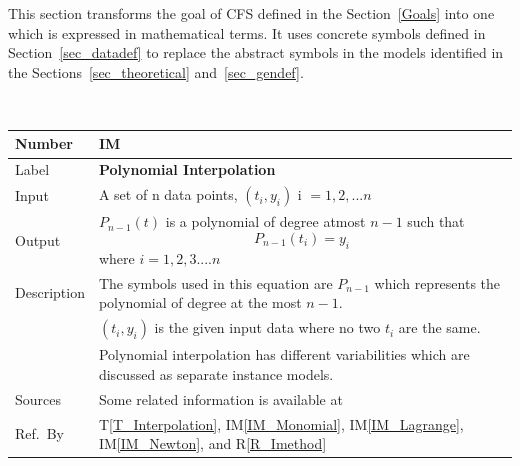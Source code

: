 \documentclass[12pt]{article}
\newcommand{\colAwidth}{0.13\textwidth}
\newcommand{\colBwidth}{0.82\textwidth}
\newcommand{\tref}[1]{T\ref{#1}}
\newcounter{instnum} %
\newcommand{\iref}[1]{IM\ref{#1}}
\newcommand{\rref}[1]{R\ref{#1}}
\newcommand{\famname}{CFS} %
\begin{document}
This section transforms the goal of \famname{} defined in the Section~\ref{Goals} into one which is expressed in mathematical terms. It uses concrete symbols defined in Section~\ref{sec_datadef} to replace the abstract symbols in the models identified in the Sections~\ref{sec_theoretical} and~\ref{sec_gendef}.

~\newline
\noindent
\begin{minipage}{\textwidth}
	\renewcommand*{\arraystretch}{1.5}
	\begin{tabular}{| p{\colAwidth} | p{\colBwidth}|}
		\hline
		\rowcolor[gray]{0.9}
		Number
		& IM{instnum}\theinstnum \label{IM_Polynomial}\\
		\hline
		
		Label
		& \bf Polynomial Interpolation\\
		\hline
		
		Input
		& A set of n data points, $(t_i,y_i)$ i $= {1,2,...n}$\\		
		\hline
		
		Output& $P_{n-1}(t)$ is a polynomial of degree atmost $n-1$ such that 
		\begin{equation*}
		P_{n-1}(t_i) = y_i
		\end{equation*}
		where $i = 1,2,3 ....n$
		\\
		\hline
		
		Description 
		& The symbols used in this equation are $P_{n-1}$ which represents the polynomial of degree at the most $n-1$.\\
		& $(t_i,y_i)$ is the given input data where no two $t_i$ are the same.\\
		&Polynomial interpolation has different variabilities which are discussed as separate instance models.\\
		\hline
		
		Sources
		& Some related information is available at ~\cite{PolyInterpolation}\\
		\hline
		Ref.\ By & \tref{T_Interpolation}, \iref{IM_Monomial}, \iref{IM_Lagrange}, \iref{IM_Newton}, and \rref{R_Imethod}\\
		\hline
	\end{tabular}
\end{minipage}\\

\end{document}
